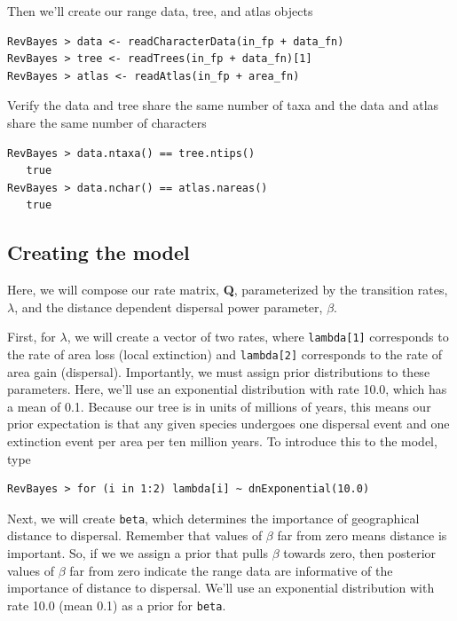 \documentclass[11pt]{article}
\begin{document}
Then we'll create our range data, tree, and atlas objects

\begin{snugshade}
\begin{lstlisting}
RevBayes > data <- readCharacterData(in_fp + data_fn)
RevBayes > tree <- readTrees(in_fp + data_fn)[1]
RevBayes > atlas <- readAtlas(in_fp + area_fn)
\end{lstlisting}
\end{snugshade}

Verify the data and tree share the same number of taxa and the data and atlas share the same number of characters

\begin{snugshade}
\begin{lstlisting}
RevBayes > data.ntaxa() == tree.ntips()
   true
RevBayes > data.nchar() == atlas.nareas()
   true
\end{lstlisting}
\end{snugshade}


\subsection{Creating the model}

Here, we will compose our rate matrix, {\bf Q}, parameterized by the transition rates, $\lambda$, and the distance dependent dispersal power parameter, $\beta$.

First, for $\lambda$, we will create a vector of two rates, where {\tt lambda[1]} corresponds to the rate of area loss (local extinction) and {\tt lambda[2]} corresponds to the rate of area gain (dispersal).
Importantly, we must assign prior distributions to these parameters.
Here, we'll use an exponential distribution with rate 10.0, which has a mean of 0.1.
Because our tree is in units of millions of years, this means our prior expectation is that any given species undergoes one dispersal event and one extinction event per area per ten million years.
To introduce this to the model, type
\begin{snugshade}
\begin{lstlisting}
RevBayes > for (i in 1:2) lambda[i] ~ dnExponential(10.0)
\end{lstlisting}
\end{snugshade}

Next, we will create {\tt beta}, which determines the importance of geographical distance to dispersal.
Remember that values of $\beta$ far from zero means distance is important.
So, if we we assign a prior that pulls $\beta$ towards zero, then posterior values of $\beta$ far from zero indicate the range data are informative of the importance of distance to dispersal.
We'll use an exponential distribution with rate 10.0 (mean 0.1) as a prior for {\tt beta}.
\end{document}
